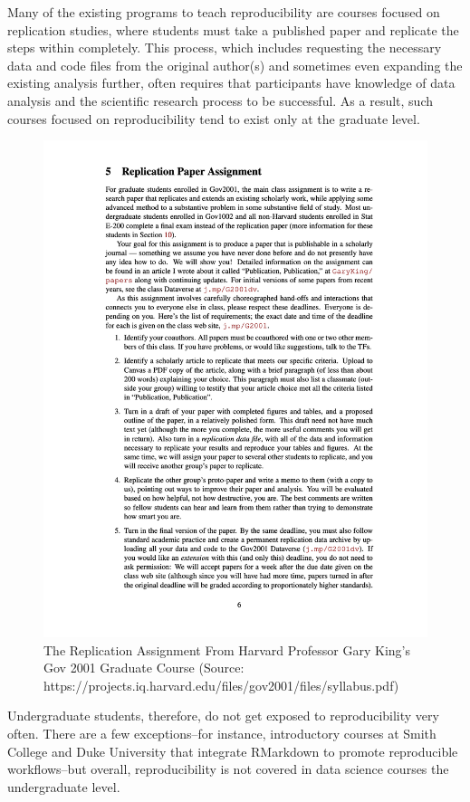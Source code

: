\documentclass[12pt,twoside]{reedthesis}
\begin{document}
Many of the existing programs to teach reproducibility are courses focused on replication studies, where students must take a published paper and replicate the steps within completely. This process, which includes requesting the necessary data and code files from the original author(s) and sometimes even expanding the existing analysis further, often requires that participants have knowledge of data analysis and the scientific research process to be successful. As a result, such courses focused on reproducibility tend to exist only at the graduate level.
\begin{figure}
\includegraphics[width=1\linewidth]{figure/gov-2001-replication} \caption{The Replication Assignment From Harvard Professor Gary King's Gov 2001 Graduate Course (Source: https://projects.iq.harvard.edu/files/gov2001/files/syllabus.pdf)}\label{fig:unnamed-chunk-45}
\end{figure}
Undergraduate students, therefore, do not get exposed to reproducibility very often. There are a few exceptions--for instance, introductory courses at Smith College and Duke University that integrate RMarkdown to promote reproducible workflows--but overall, reproducibility is not covered in data science courses the undergraduate level.
\end{document}
